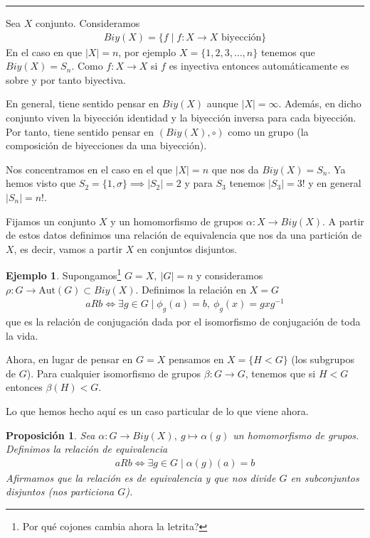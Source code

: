 \documentclass{book}
\newtheorem{pro}{Proposición}
\theoremstyle{definition}
\newtheorem{ej}{Ejemplo}
\theoremstyle{remark}
\newcommand{\inv}[1]{#1^{-1}}
\newcommand{\autom}[1]{\text{Aut}(#1)}
\newcommand{\hr}{\rule{\textwidth}{.4pt}}
\begin{document}
\hr

Sea $X$ conjunto. Consideramos
\begin{align*}
	Biy(X) = \{f \mid f: X \to X \text{ biyección}\}
\end{align*}
En el caso en que $|X| = n$, por ejemplo $X = \{1, 2, 3, \dots, n\}$ tenemos que $Biy(X) = S_n$. Como $f:X \to X$ si $f$ es inyectiva entonces automáticamente es sobre y por tanto biyectiva.

En general, tiene sentido pensar en $Biy(X)$ aunque $|X| = \infty$. Además, en dicho conjunto viven la biyección identidad y la biyección inversa para cada biyección. Por tanto, tiene sentido pensar en $(Biy(X), \circ)$ como un grupo (la composición de biyecciones da una biyección).

Nos concentramos en el caso en el que $|X| = n$ que nos da $Biy(X) = S_n$. Ya hemos visto que $S_2 = \{1, \sigma\} \implies |S_2| = 2$ y para $S_3$ tenemos $|S_3| = 3!$ y en general $|S_n| = n!$.

Fijamos un conjunto $X$ y un homomorfismo de grupos $\alpha: X \to Biy(X)$. A partir de estos datos definimos una relación de equivalencia que nos da una partición de $X$, es decir, vamos a partir $X$ en conjuntos disjuntos.

\begin{ej}
	Supongamos\footnote{Por qué cojones cambia ahora la letrita?} $G = X,\ |G| = n$ y consideramos $\rho: G \to \autom{G} \subset Biy(X)$. Definimos la relación en $X = G$
	\begin{align*}
		aRb \iff \exists g \in G \mid \phi_g(a) = b,\ \phi_g(x) = gx\inv{g}
	\end{align*}
	que es la relación de conjugación dada por el isomorfismo de conjugación de toda la vida.
	
	Ahora, en lugar de pensar en $G = X$ pensamos en $X = \{H < G\}$ (los subgrupos de $G$). Para cualquier isomorfismo de grupos $\beta: G \to G$, tenemos que si $H < G$ entonces $\beta(H) < G$.
	
	Lo que hemos hecho aquí es un caso particular de lo que viene ahora.
\end{ej}

\begin{pro}
	Sea $\alpha: G \to Biy(X),\ g \mapsto \alpha(g)$ un homomorfismo de grupos. Definimos la relación de equivalencia
	\begin{align}
	aRb \iff \exists g \in G \mid \alpha(g)(a) = b
	\end{align}
	Afirmamos que la relación es de equivalencia y que nos divide $G$ en subconjuntos disjuntos (nos particiona $G$).
\end{pro}
\end{document}
